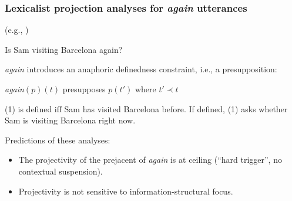 \documentclass[pdf,xcolor=table,envcountsect,handout]{beamer}
\begin{document}
\begin{frame}
\frametitle{Lexicalist projection analyses for {\em again} utterances}


\hfill \begin{tiny} (e.g., \citealt{heim83,vds92,blutnerjager,beck2006,abrusan2013b})\end{tiny}
\vspace*{-.2cm}

\begin{exe}
 Is Sam visiting Barcelona again?
\end{exe}

\pause

{\em again} introduces an anaphoric definedness constraint, i.e., a presupposition:

\begin{exe}
 {\em again}$(p)(t)$ presupposes $p(t')$ where $t' \prec t$
\end{exe}

(1) is defined iff Sam has visited Barcelona before. If defined, (1) asks whether Sam is visiting Barcelona right now.

\medskip
\pause

Predictions of these analyses:

\begin{itemize}[topsep=-5pt,leftmargin=5ex]

\item The projectivity of the prejacent of {\em again} is at ceiling (``hard trigger'', no contextual suspension).

\item Projectivity is not sensitive to information-structural focus.

%

\end{itemize}
\end{frame}
\end{document}
